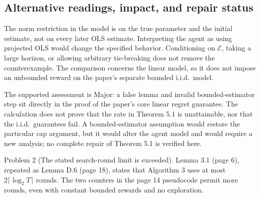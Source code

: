 \documentclass[10pt]{article}
\begin{document}
\subsection*{Alternative readings, impact, and repair status}
The norm restriction in the model is on the true parameter and the initial estimate, not on every later OLS estimate. Interpreting the agent as using projected OLS would change the specified behavior. Conditioning on \(\mathcal E\), taking a large horizon, or allowing arbitrary tie-breaking does not remove the counterexample. The comparison concerns the linear model, so it does not impose an unbounded reward on the paper’s separate bounded i.i.d. model.\par
The supported assessment is Major: a false lemma and invalid bounded-estimator step sit directly in the proof of the paper’s core linear regret guarantee. The calculation does not prove that the rate in Theorem 5.1 is unattainable, nor that the i.i.d. guarantees fail. A bounded-estimator assumption would restore the particular cap argument, but it would alter the agent model and would require a new analysis; no complete repair of Theorem 5.1 is verified here.\par
Problem 2 (The stated search-round limit is exceeded).  Lemma 3.1 (page 6), repeated as Lemma D.6 (page 18), states that Algorithm 3 uses at most \(2\lceil\log_2 T\rceil\) rounds. The two counters in the page 14 pseudocode permit more rounds, even with constant bounded rewards and no exploration.\par
\end{document}

